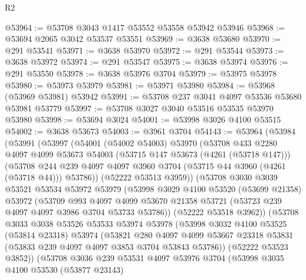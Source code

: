 \begin{lexlean}{R2}
\begin{coremodule}
@53964 := @53708 @3043 @1417 @53552 @53558 @53942 @53946
@53968 := @53694 @2065 @3042 @53537 @53551
@53969 := @3638 @53680
@53970 := @291 @53541
@53971 := @3638 @53970
@53972 := @291 @53544
@53973 := @3638 @53972
@53974 := @291 @53547
@53975 := @3638 @53974
@53976 := @291 @53550
@53978 := @3638 @53976 @3704
@53979 := @53975 @53978
@53980 := @53973 @53979
@53981 := @53971 @53980
@53984 := @53968 (@53969 @53981) @53942
@53991 := @53708 @237 @3041 @4097 @53536 @53680 @53981 @53779
@53997 := @53708 @3027 @3040 @53516 @53535 @53970 @53980
@53998 := @53694 @3024
@54001 := @53998 @3026 @4100 @53515
@54002 := @3638 @53673
@54003 := @3961 @3704
@54143 := @53964
    (@53984
      (@53991
        (@53997
          (@54001
            (@54002 @54003)
            @53970
            (@53708
              @433
              @2280
              @4097
              @4099
              @53673
              @54003
              (@53715 @147 @53673 (@4261 (@53718 @147)))
              (@53708
                @244
                @239
                @4097
                @4097
                @3960
                @3704
                (@53715 @44 @3960 (@4261 (@53718 @44)))
                @53786))
            (@52222 @53513 @3959))
          (@53708
            @3030
            @3039
            @53521
            @53534
            @53972
            @53979
            (@53998
              @3029
              @4100
              @53520
              (@53699 @21358)
              @53972
              (@53709
                @993
                @4097
                @4099
                @53670
                @21358
                @53721
                (@53723 @239 @4097 @4097 @3986 @3704 @53733 @53786))
              (@52222 @53518 @3962))
            (@53708
              @3033
              @3038
              @53526
              @53533
              @53974
              @53978
              (@53998
                @3032
                @4100
                @53525
                (@53814 @23318)
                @53974
                (@53821
                  @280
                  @4097
                  @4099
                  @53667
                  @23318
                  @53831
                  (@53833 @239 @4097 @4097 @3853 @3704 @53843 @53786))
                (@52222 @53523 @3852))
              (@53708
                @3036
                @239
                @53531
                @4097
                @53976
                @3704
                (@53998
                  @3035
                  @4100
                  @53530
                  (@53877 @23143)

\end{coremodule}
\end{lexlean}
